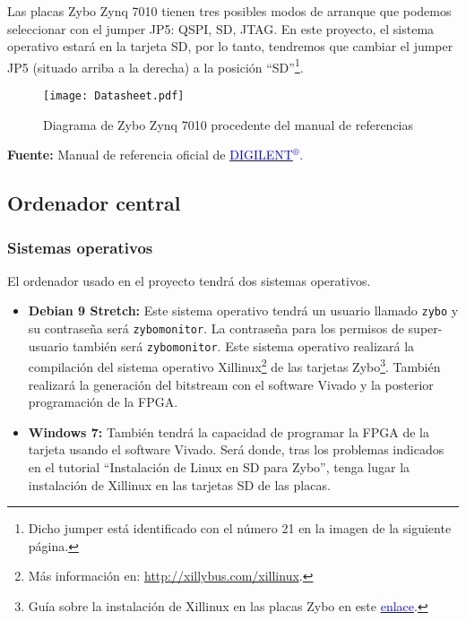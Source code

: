 \documentclass[12pt,letterpaper]{article}
\begin{document}
Las placas Zybo Zynq 7010 tienen tres posibles modos de arranque que podemos seleccionar con el jumper JP5: QSPI, SD, JTAG. En este proyecto, el sistema operativo estará en la tarjeta SD, por lo tanto, tendremos que cambiar el jumper JP5 (situado arriba a la derecha) a la posición ``SD''\footnote{Dicho jumper está identificado con el número 21 en la imagen de la siguiente página.}.
\newpage
\begin{figure}[h]
	\centering
	\texttt{[image: Datasheet.pdf]}
	\caption{Diagrama de Zybo Zynq 7010 procedente del manual de referencias}
	\label{Diagrama de Zybo Zynq 7010 procedente del manual de referencias}
\end{figure}
\begin{center}
	\textbf{Fuente:} Manual de referencia oficial de \href{https://reference.digilentinc.com/_media/zybo:zybo_rm.pdf}{\textcolor{blue}{DIGILENT$^{\circledR}$}}.
\end{center}

\newpage
\subsection{Ordenador central}
\subsubsection{Sistemas operativos}
El ordenador usado en el proyecto tendrá dos sistemas operativos.
\begin{itemize}
	\item \textbf{Debian 9 Stretch:} Este sistema operativo tendrá un usuario llamado \texttt{zybo} y su contraseña será \texttt{zybomonitor}. La contraseña para los permisos de super-usuario también será \texttt{zybomonitor}. Este sistema operativo realizará la compilación del sistema operativo Xillinux\footnote{Más información en: \url{http://xillybus.com/xillinux}.} de las tarjetas Zybo\footnote{Guía sobre la instalación de Xillinux en las placas Zybo en este \href{http://diebotreise.blogspot.com/2017/03/tutorial-zybo-linux-i-como-cargar-linux.html}{\textcolor{blue}{enlace}}.}. También realizará la generación del bitstream con el software Vivado y la posterior programación de la FPGA.
	\item \textbf{Windows 7:} También tendrá la capacidad de programar la FPGA de la tarjeta usando el software Vivado. Será donde, tras los problemas indicados en el tutorial ``Instalación de Linux en SD para Zybo'', tenga lugar la instalación de Xillinux en las tarjetas SD de las placas.
\end{itemize}
\end{document}

